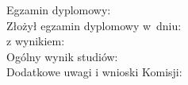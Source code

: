 \newpage
	\thispagestyle{empty}
\begin{flushleft}
    	\begin{minipage}{11cm}
		Egzamin dyplomowy: \\
		Złożył egzamin dyplomowy w~dniu: \dotfill \\
		z wynikiem: \dotfill \\
		Ogólny wynik studiów: \dotfill \\
		Dodatkowe uwagi i wnioski Komisji: \dotfill \\
		\dotfill
	\end{minipage}
\end{flushleft}
